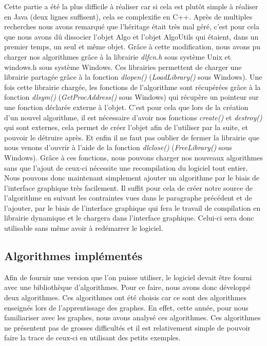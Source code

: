 \documentclass[11pt,a4paper]{article}
\begin{document}
			Cette partie a été la plus difficile à réaliser car si cela est plutôt simple à réaliser en Java (deux lignes suffisent), cela se complexifie en C++. Après de multiples recherches nous avons remarqué que l'héritage était très mal géré, c'est pour cela que nous avons dû dissocier l'objet Algo et l'objet AlgoUtils qui étaient, dans un premier temps, un seul et même objet. Grâce à cette modification, nous avons pu charger nos algorithmes grâce à la librairie \textit{dlfcn.h} sous système Unix et windows.h sous système Windows. Ces librairies permettent de charger une librairie partagée grâce à la fonction \textit{dlopen()} (\textit{LoadLibrary()} sous Windows). Une fois cette librairie chargée, les fonctions de l'algorithme sont récupérées grâce à la fonction \textit{dlsym()} (\textit{GetProcAddress()} sous Windows) qui récupère un pointeur sur une fonction déclarée externe à l'objet. C'est pour cela que lors de la création d'un nouvel algorithme, il est nécessaire d'avoir nos fonctions \textit{create()} et \textit{destroy()} qui sont externes, cela permet de créer l'objet afin de l'utiliser par la suite, et pouvoir le détruire après. Et enfin il ne faut pas oublier de fermer la librairie que nous venons d'ouvrir à l'aide de la fonction \textit{dlclose()} (\textit{FreeLibrary()} sous Windows). Grâce à ces fonctions, nous pouvons charger nos nouveaux algorithmes sans que l'ajout de ceux-ci nécessite une recompilation du logiciel tout entier. Nous pouvons donc maintenant simplement ajouter un algorithme par le biais de l'interface graphique très facilement. Il suffit pour cela de créer notre source de l'algorithme en suivant les contraintes vues dans le paragraphe précédent et de l'ajouter, par le biais de l'interface graphique qui fera le travail de compilation en librairie dynamique et le chargera dans l'interface graphique. Celui-ci sera donc utilisable sans même avoir à redémarrer le logiciel. 
		
		\subsection{Algorithmes implémentés}
			Afin de fournir une version que l'on puisse utiliser, le logiciel devait être fourni avec une bibliothèque d'algorithmes. Pour ce faire, nous avons donc développé deux algorithmes. Ces algorithmes ont été choisis car ce sont des algorithmes enseignés lors de l'apprentissage des graphes. En effet, cette année, pour nous familiariser avec les graphes, nous avons analysé ces algorithmes. Ces algorithmes ne présentent pas de grosses difficultés et il est relativement simple de pouvoir faire la trace de ceux-ci en utilisant des petits exemples.
\end{document}
